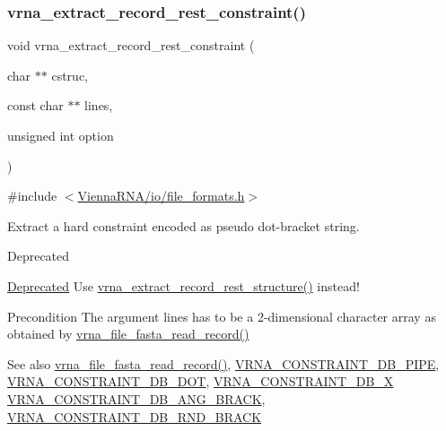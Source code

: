 \subsubsection{\texorpdfstring{vrna\+\_\+extract\+\_\+record\+\_\+rest\+\_\+constraint()}{vrna\_extract\_record\_rest\_constraint()}}
{\footnotesize\ttfamily void vrna\+\_\+extract\+\_\+record\+\_\+rest\+\_\+constraint (\begin{DoxyParamCaption}\item[{char $\ast$$\ast$}]{cstruc,  }\item[{const char $\ast$$\ast$}]{lines,  }\item[{unsigned int}]{option }\end{DoxyParamCaption})}



{\ttfamily \#include $<$\hyperlink{io_2file__formats_8h}{Vienna\+R\+N\+A/io/file\+\_\+formats.\+h}$>$}



Extract a hard constraint encoded as pseudo dot-\/bracket string. 

\begin{DoxyRefDesc}{Deprecated}
\item[\hyperlink{deprecated__deprecated000156}{Deprecated}]Use \hyperlink{group__file__formats_gad37cbb63a05eed63ba25c91628409be0}{vrna\+\_\+extract\+\_\+record\+\_\+rest\+\_\+structure()} instead! \end{DoxyRefDesc}
\begin{DoxyPrecond}{Precondition}
The argument \textquotesingle{}lines\textquotesingle{} has to be a 2-\/dimensional character array as obtained by \hyperlink{group__file__formats_ga8cfb7e271efc9e1f34640acb85475639}{vrna\+\_\+file\+\_\+fasta\+\_\+read\+\_\+record()} 
\end{DoxyPrecond}
\begin{DoxySeeAlso}{See also}
\hyperlink{group__file__formats_ga8cfb7e271efc9e1f34640acb85475639}{vrna\+\_\+file\+\_\+fasta\+\_\+read\+\_\+record()}, \hyperlink{group__hard__constraints_ga13053547a2de5532b64b64d35e097ae1}{V\+R\+N\+A\+\_\+\+C\+O\+N\+S\+T\+R\+A\+I\+N\+T\+\_\+\+D\+B\+\_\+\+P\+I\+PE}, \hyperlink{group__hard__constraints_ga369bea82eae75fbe626f409fa425747e}{V\+R\+N\+A\+\_\+\+C\+O\+N\+S\+T\+R\+A\+I\+N\+T\+\_\+\+D\+B\+\_\+\+D\+OT}, \hyperlink{group__hard__constraints_ga7283bbe0f8954f7b030ecc3f2d1932b2}{V\+R\+N\+A\+\_\+\+C\+O\+N\+S\+T\+R\+A\+I\+N\+T\+\_\+\+D\+B\+\_\+X} \hyperlink{hard_8h_ad54c1315a47d55653dcaa5de6e544b77}{V\+R\+N\+A\+\_\+\+C\+O\+N\+S\+T\+R\+A\+I\+N\+T\+\_\+\+D\+B\+\_\+\+A\+N\+G\+\_\+\+B\+R\+A\+CK}, \hyperlink{group__hard__constraints_gac17b034852c914bc5879954c65d7e74b}{V\+R\+N\+A\+\_\+\+C\+O\+N\+S\+T\+R\+A\+I\+N\+T\+\_\+\+D\+B\+\_\+\+R\+N\+D\+\_\+\+B\+R\+A\+CK}
\end{DoxySeeAlso}

